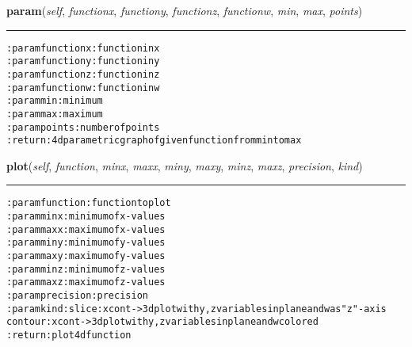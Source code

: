     \vspace{0.5ex}

\hspace{.8\funcindent}\begin{boxedminipage}{\funcwidth}

    \raggedright \textbf{param}(\textit{self}, \textit{functionx}, \textit{functiony}, \textit{functionz}, \textit{functionw}, \textit{min}, \textit{max}, \textit{points})

    \vspace{-1.5ex}

    \rule{\textwidth}{0.5\fboxrule}
\setlength{\parskip}{2ex}
\begin{alltt}

:param functionx: function in x
:param functiony: function in y
:param functionz: function in z
:param functionw: function in w
:param min: minimum
:param max: maximum
:param points: number of points
:return: 4d parametric graph of given function from min to max
\end{alltt}

\setlength{\parskip}{1ex}
    \end{boxedminipage}

    \label{hal:charts:plotter:Plot4d:plot}

    \vspace{0.5ex}

\hspace{.8\funcindent}\begin{boxedminipage}{\funcwidth}

    \raggedright \textbf{plot}(\textit{self}, \textit{function}, \textit{minx}, \textit{maxx}, \textit{miny}, \textit{maxy}, \textit{minz}, \textit{maxz}, \textit{precision}, \textit{kind})

    \vspace{-1.5ex}

    \rule{\textwidth}{0.5\fboxrule}
\setlength{\parskip}{2ex}
\begin{alltt}

:param function: function to plot
:param minx: minimum of x-values
:param maxx: maximum of x-values
:param miny: minimum of y-values
:param maxy: maximum of y-values
:param minz: minimum of z-values
:param maxz: maximum of z-values
:param precision: precision
:param kind: slice: x cont -{\textgreater} 3d plot with y,z variables in plane and w as "z"-axis
             contour: x cont -{\textgreater} 3d plot with y,z variables in plane and w colored
:return: plot 4d function
\end{alltt}

\setlength{\parskip}{1ex}
    \end{boxedminipage}


